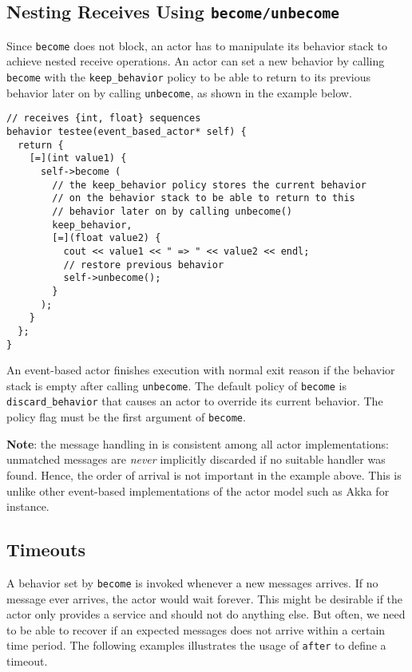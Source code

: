 \clearpage
\subsection{Nesting Receives Using \lstinline^become/unbecome^}

Since \lstinline^become^ does not block, an actor has to manipulate its behavior stack to achieve nested receive operations.
An actor can set a new behavior by calling \lstinline^become^ with the \lstinline^keep_behavior^ policy to be able to return to its previous behavior later on by calling \lstinline^unbecome^, as shown in the example below.

\begin{lstlisting}
// receives {int, float} sequences
behavior testee(event_based_actor* self) {
  return {
    [=](int value1) {
      self->become (
        // the keep_behavior policy stores the current behavior
        // on the behavior stack to be able to return to this
        // behavior later on by calling unbecome()
        keep_behavior,
        [=](float value2) {
          cout << value1 << " => " << value2 << endl;
          // restore previous behavior
          self->unbecome();
        }
      );
    }
  };
}
\end{lstlisting}

An event-based actor finishes execution with normal exit reason if the behavior stack is empty after calling \lstinline^unbecome^.
The default policy of \lstinline^become^ is \lstinline^discard_behavior^ that causes an actor to override its current behavior.
The policy flag must be the first argument of \lstinline^become^.

\textbf{Note}: the message handling in \lib is consistent among all actor implementations: unmatched messages are \textit{never} implicitly discarded if no suitable handler was found.
Hence, the order of arrival is not important in the example above.
This is unlike other event-based implementations of the actor model such as Akka for instance.

\clearpage
\subsection{Timeouts}
\label{Sec::Receive::Timeouts}

A behavior set by \lstinline^become^ is invoked whenever a new messages arrives.
If no message ever arrives, the actor would wait forever.
This might be desirable if the actor only provides a service and should not do anything else.
But often, we need to be able to recover if an expected messages does not arrive within a certain time period. The following examples illustrates the usage of \lstinline^after^ to define a timeout.

